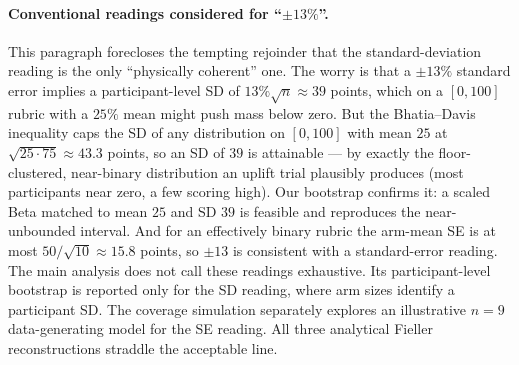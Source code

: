 \documentclass{article}
\begin{document}
\paragraph{Conventional readings considered for ``$\pm 13\%$''.}
This paragraph forecloses the tempting rejoinder that the standard-deviation reading is the only
``physically coherent'' one. The worry is that a $\pm 13\%$ standard error implies a
participant-level SD of $13\%\sqrt{n} \approx 39$ points, which on a $[0,100]$ rubric with a
$25\%$ mean might push mass below zero. But the Bhatia--Davis inequality caps the SD of any
distribution on $[0,100]$ with mean $25$ at $\sqrt{25\cdot 75} \approx 43.3$ points, so an SD
of $39$ is attainable --- by exactly the floor-clustered, near-binary distribution an uplift
trial plausibly produces (most participants near zero, a few scoring high). Our bootstrap
confirms it: a scaled Beta matched to mean $25$ and SD $39$ is feasible and reproduces the
near-unbounded interval. And for an effectively binary rubric the arm-mean SE is at most
$50/\sqrt{10} \approx 15.8$ points, so $\pm 13$ is consistent with a standard-error reading.
The main analysis does not call these readings exhaustive. Its participant-level bootstrap
is reported only for the SD reading, where arm sizes identify a participant SD. The coverage
simulation separately explores an illustrative $n=9$ data-generating model for the SE
reading. All three analytical Fieller reconstructions straddle the acceptable line.
\end{document}
